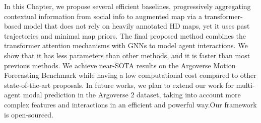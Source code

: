 In this Chapter, we propose several efficient baselines, progressively aggregating contextual information from social info to augmented map via a transformer-based model that does not rely on heavily annotated HD maps, yet it uses past trajectories and minimal map priors.
%
The final proposed method combines the transformer attention mechanisms with GNNs to model agent interactions. We show that it has less parameters than other methods, and it is faster than most previous methods. We achieve near-SOTA results on the Argoverse Motion Forecasting Benchmark while having a low computational cost compared to other state-of-the-art proposals. In future works, we plan to extend our work for multi-agent modal prediction in the Argoverse 2 dataset, taking into account more complex features and interactions in an efficient and powerful way.Our framework is open-sourced.